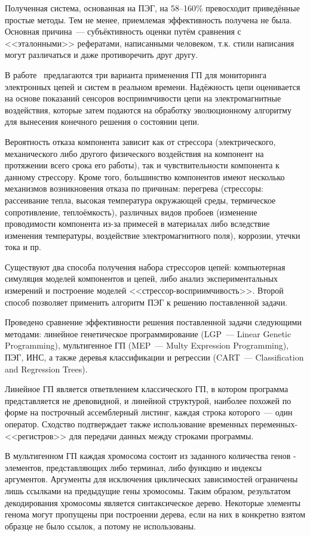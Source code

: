 Полученная система, основанная на ПЭГ, на 58--160\% превосходит приведённые простые методы. Тем не менее, приемлемая эффективность получена не была. Основная причина~--- субъёктивность оценки путём сравнения с <<эталонными>> рефератами, написанными человеком, т.к. стили написания могут различаться и даже противоречить друг другу.

В работе~\cite{journals/jucs/AbrahamG06} предлагаются три варианта применения ГП для мониторинга электронных цепей и систем в реальном времени. Надёжность цепи оценивается на основе показаний сенсоров восприимчивости цепи на электромагнитные воздействия, которые затем подаются на обработку эволюционному алгоритму для вынесения конечного решения о состоянии цепи.

Вероятность отказа компонента зависит как от стрессора (электрического, механического либо другого физического воздействия на компонент на протяжении всего срока его работы), так и чувствительности компонента к данному стрессору. Кроме того, большинство компонентов имеют несколько механизмов возникновения отказа по причинам: перегрева (стрессоры: рассеивание тепла, высокая температура окружающей среды, термическое сопротивление, теплоёмкость), различных видов пробоев (изменение проводимости компонента из-за примесей в материалах либо вследствие изменения температуры, воздействие электромагнитного поля), коррозии, утечки тока и пр.

Существуют два способа получения набора стрессоров цепей: компьютерная симуляция моделей компонентов и цепей, либо анализ экспериментальных измерений и построение моделей <<стрессор-восприимчивость>>. Второй способ позволяет применить алгоритм ПЭГ к решению поставленной задачи.

Проведено сравнение эффективности решения поставленной задачи следующими методами: линейное генетическое программирование (LGP~--- Linear Genetic Programming), мультигенное ГП (MEP~--- Multy Expression Programming), ПЭГ, ИНС, а также деревья классификации и регрессии (CART~--- Classification and Regression Trees).

Линейное ГП является ответвлением классического ГП, в котором программа представляется не древовидной, и линейной структурой, наиболее похожей по форме на построчный ассемблерный листинг, каждая строка которого~--- один оператор. Сходство подтверждает также использование временных переменных-<<регистров>> для передачи данных между строками программы.

В мультигенном ГП каждая хромосома состоит из заданного количества генов - элементов, представляющих либо терминал, либо функцию и индексы аргументов. Аргументы для исключения циклических зависимостей ограничены лишь ссылками на предыдущие гены хромосомы. Таким образом, результатом декодирования хромосомы является синтаксическое дерево. Некоторые элементы генома могут пропущены при построении дерева, если на них в конкретно взятом образце не было ссылок, а потому не использованы.

